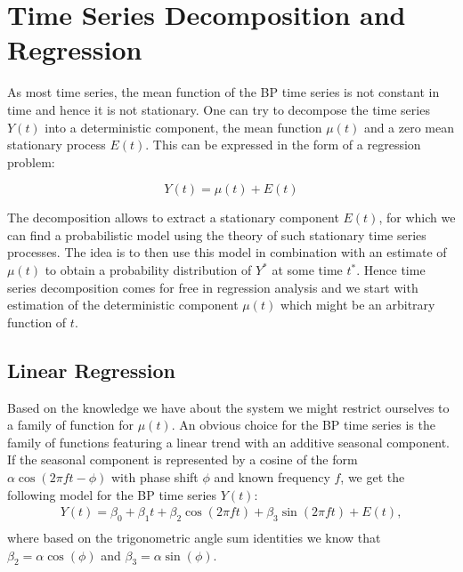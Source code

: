 

\chapter{Time Series Decomposition and Regression}\label{ch:time-series-decomposition-and-regression}



As most time series, the mean function of the BP time series is not constant in time and hence it is not stationary.
One can try to decompose the time series $Y(t)$ into a deterministic component, the mean function $\mu(t)$
and a zero mean stationary process $E(t)$. This can be expressed in the form of a regression problem:

\[ Y(t)= \mu(t) + E(t) \]

The decomposition allows to extract a stationary component $E(t)$, for which we can find a probabilistic model
using the theory of such stationary time series processes. The idea is to then use this model in combination
with an estimate of $\mu(t)$ to obtain a probability distribution of $Y^{\ast}$ at some time $t^{\ast}$.
Hence time series decomposition comes for free in regression analysis and we start with estimation of
the deterministic component $\mu(t)$ which might be an arbitrary function of $t$.

\section{Linear Regression}\label{sec:linear-regression}
Based on the knowledge we have about the system we might restrict ourselves to a family of function for $\mu(t)$.
An obvious choice for the BP time series is the family of functions featuring a linear trend
with an additive seasonal component.
If the seasonal component is represented by a cosine of the form $\alpha \cos(2 \pi f t - \phi)$ with phase shift $\phi$
and known frequency $f$, we get the following model for the BP time series $Y(t)$:
\begin{gather*}
Y(t) = \beta_0 + \beta_1 t + \beta_2 \cos(2 \pi f t) + \beta_3 \sin(2 \pi f t) + E(t), \\
\end{gather*}
where based on the trigonometric angle sum identities we know that $\beta_2 = \alpha \cos(\phi)$ and $\beta_3 = \alpha \sin(\phi)$.

